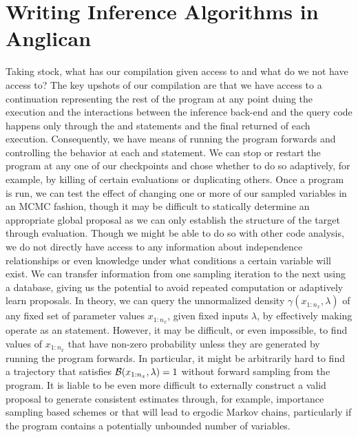 
\section{Writing Inference Algorithms in Anglican}
\label{sec:proginf:inf}

Taking stock, what has our compilation
given access to and what do we not have access to?  The key upshots of our compilation are
that we have access to a continuation representing the rest of the program at any point
duing the execution and 
the interactions between the inference back-end and the query code happens only through
the \sample and \observe statements and the final returned \angstate of each execution.
Consequently, we have means of running the program
forwards and controlling the behavior at each \sample and \observe statement.  We can
stop or restart the program at any one of our checkpoints and chose whether to do so
adaptively, for example, by killing of certain evaluations or duplicating others.  Once
a program is run, we can test the effect of changing one or more of our sampled variables
in an MCMC fashion, though it may be difficult to statically determine an appropriate global proposal
as we can only establish the structure of the target through evaluation.  Though we might be
able to do so with other code analysis, we do not directly have access to any information
about independence relationships or even knowledge under what conditions a certain
variable will exist.  We can transfer information from one sampling iteration to the next
using a database, giving us the potential to avoid repeated computation or adaptively learn proposals.
In theory, we can query the unnormalized density $\gamma(x_{1:n_x},\lambda)$ of any fixed set of 
parameter values $x_{1:n_x}$, given fixed inputs $\lambda$, by effectively making
\sample operate as an \observe statement.  However, it may be difficult, or even impossible, to find
values of $x_{1:n_x}$ that have non-zero probability unless they are generated by running
the program forwards.  In particular, it might be arbitrarily hard to find a trajectory that satisfies
$\mathcal{B}(x_{1:n_x},\lambda)=1$ without forward sampling from the program.  It is liable
to be even more difficult to externally construct a valid proposal to generate consistent estimates
through, for example, importance sampling based schemes or that will lead to ergodic Markov chains,
particularly if the program contains a potentially unbounded number of variables.

